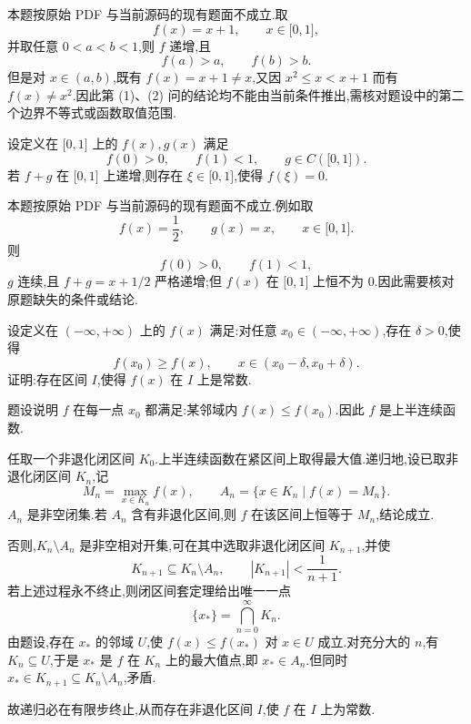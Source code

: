 \begin{solution}
    本题按原始 PDF 与当前源码的现有题面不成立.取
    \[
        f(x)=x+1,
        \qquad
        x\in\lbrack0,1\rbrack,
    \]
    并取任意 $0<a<b<1$,则 $f$ 递增,且
    \[
        f(a)>a,
        \qquad
        f(b)>b.
    \]
    但是对 $x\in(a,b)$,既有 $f(x)=x+1\neq x$,又因 $x^2\leq x<x+1$ 而有 $f(x)\neq x^2$.因此第 (1)、(2) 问的结论均不能由当前条件推出,需核对题设中的第二个边界不等式或函数取值范围.
\end{solution}

\begin{example}
    设定义在 $\lbrack 0,1\rbrack$ 上的 $f(x),g(x)$ 满足
    \[
        f(0)>0,\qquad f(1)<1,\qquad g\in C(\lbrack 0,1\rbrack).
    \]
    若 $f+g$ 在 $\lbrack 0,1\rbrack$ 上递增,则存在 $\xi\in\lbrack 0,1\rbrack$,使得 $f(\xi)=0$.
\end{example}
\exampleblank

\begin{solution}
    本题按原始 PDF 与当前源码的现有题面不成立.例如取
    \[
        f(x)=\dfrac{1}{2},
        \qquad
        g(x)=x,
        \qquad
        x\in\lbrack0,1\rbrack.
    \]
    则
    \[
        f(0)>0,
        \qquad
        f(1)<1,
    \]
    $g$ 连续,且 $f+g=x+1/2$ 严格递增;但 $f(x)$ 在 $\lbrack0,1\rbrack$ 上恒不为 $0$.因此需要核对原题缺失的条件或结论.
\end{solution}

\begin{example}
    设定义在 $(-\infty,+\infty)$ 上的 $f(x)$ 满足:对任意 $x_0\in(-\infty,+\infty)$,存在 $\delta>0$,使得
    \[
        f(x_0)\geq f(x),
        \qquad x\in(x_0-\delta,x_0+\delta).
    \]
    证明:存在区间 $I$,使得 $f(x)$ 在 $I$ 上是常数.
\end{example}
\exampleblank

\begin{solution}
    题设说明 $f$ 在每一点 $x_0$ 都满足:某邻域内 $f(x)\leq f(x_0)$.因此 $f$ 是上半连续函数.

    任取一个非退化闭区间 $K_0$.上半连续函数在紧区间上取得最大值.递归地,设已取非退化闭区间 $K_n$,记
    \[
        M_n=\max\limits_{x\in K_n}f(x),
        \qquad
        A_n=\{x\in K_n\mid f(x)=M_n\}.
    \]
    $A_n$ 是非空闭集.若 $A_n$ 含有非退化区间,则 $f$ 在该区间上恒等于 $M_n$,结论成立.

    否则,$K_n\setminus A_n$ 是非空相对开集,可在其中选取非退化闭区间
    $K_{n+1}$,并使
    \[
        K_{n+1}\subseteq K_n\setminus A_n,
        \qquad
        |K_{n+1}|<\dfrac{1}{n+1}.
    \]
    若上述过程永不终止,则闭区间套定理给出唯一一点
    \[
        \{x_*\}=\bigcap\limits_{n=0}^{\infty}K_n.
    \]
    由题设,存在 $x_*$ 的邻域 $U$,使 $f(x)\leq f(x_*)$ 对 $x\in U$ 成立.对充分大的 $n$,有 $K_n\subseteq U$,于是 $x_*$ 是 $f$ 在 $K_n$ 上的最大值点,即 $x_*\in A_n$.但同时
    $x_*\in K_{n+1}\subseteq K_n\setminus A_n$,矛盾.

    故递归必在有限步终止,从而存在非退化区间 $I$,使 $f$ 在 $I$ 上为常数.
\end{solution}
